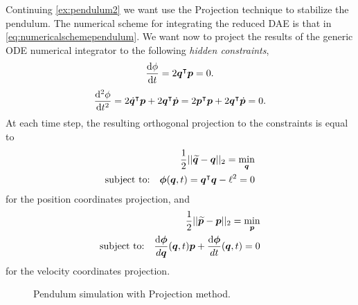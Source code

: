 \begin{example}
			Continuing \cref{ex:pendulum2} we want use the Projection technique to stabilize the pendulum. The numerical scheme for integrating the reduced DAE is that in \cref{eq:numericalschemependulum}. We want now to project the results of the generic ODE numerical integrator to the following \emph{hidden constraints},
			\begin{equation*}
				\frac{\mathop{}\!\mathrm{d}\phi}{\mathop{}\!\mathrm{d} t} = 2\bm{q}^{\intercal}\bm{p} = 0.
			\end{equation*}
			\begin{equation*}
				\frac{\mathop{}\!\mathrm{d}^{2}\phi}{\mathop{}\!\mathrm{d} t^2} = 2\dot{\bm{q}}^{\intercal}\bm{p} + 2\bm{q}^{\intercal}\dot{\bm{p}} = 2\bm{p}^{\intercal}\bm{p} + 2\bm{q}^{\intercal}\dot{\bm{p}} = 0.
			\end{equation*}
			At each time step, the resulting orthogonal projection to the constraints is equal to
			\begin{equation}
				\begin{split}
				\dfrac{1}{2}|| \widetilde{\bm{q}} - \bm{q} ||_2 = \min_{\bm{q}}\\
					\text{subject to:} \quad \bm{\phi}(\bm{q},t) = \bm{q}^{\intercal}\bm{q} - \ell^{2} = 0
				\end{split}
			\end{equation}
			for the position coordinates projection, and
			\begin{equation}
				\begin{split}
				\dfrac{1}{2}|| \widetilde{\bm{p}} - \bm{p} ||_2 = \min_{\bm{p}}\\
					\text{subject to:} \quad \frac{\mathop{}\!\mathrm{d}\bm{\phi}}{d\bm{q}}(\bm{q},t)\bm{p} + \frac{\mathop{}\!\mathrm{d}\bm{\phi}}{dt}(\bm{q},t)= 0
				\end{split}
			\end{equation}
			for the velocity coordinates projection.
			\begin{figure}[htbp]
				\centering
				\caption{Pendulum simulation with Projection method.}
				\label{}
			\end{figure}
		\end{example}
		

		
		